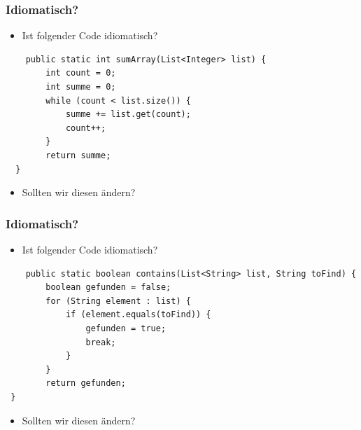 \begin{frame}[fragile]
\frametitle{Idiomatisch?}
\begin{itemize}
    \item Ist folgender Code idiomatisch?
\end{itemize}
\begin{lstlisting}
    public static int sumArray(List<Integer> list) {
        int count = 0;
        int summe = 0;
        while (count < list.size()) {
            summe += list.get(count);
            count++;
        }
        return summe;
  }
\end{lstlisting}

\begin{itemize}
    \item Sollten wir diesen ändern?
\end{itemize}
\end{frame}

\begin{frame}[fragile]
\frametitle{Idiomatisch?}
\begin{itemize}
    \item Ist folgender Code idiomatisch?
\end{itemize}
\begin{lstlisting}
    public static boolean contains(List<String> list, String toFind) {
        boolean gefunden = false;
        for (String element : list) {
            if (element.equals(toFind)) {
                gefunden = true;
                break;
            }
        }
        return gefunden;
 }
\end{lstlisting}

\begin{itemize}
    \item Sollten wir diesen ändern?
\end{itemize}
\end{frame}

